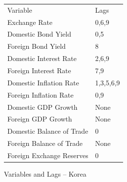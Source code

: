\documentclass{sig-alternate-05-2015}
\begin{document}
\begin{figure}
\centering
\caption{Variables and Lags -- Korea}
\begin{tabular}{l l}
Variable 					& Lags  \\
Exchange Rate 				& 0,6,9		\\
Domestic Bond Yield			& 0,5	\\
Foreign Bond Yield			& 8	\\
Domestic Interest Rate		& 2,6,9	\\
Foreign Interest Rate		& 7,9	\\
Domestic Inflation Rate		& 1,3,5,6,9	\\
Foreign Inflation Rate		& 0,9	\\
Domestic GDP Growth			& None	\\
Foreign GDP Growth			& None		\\
Domestic Balance of Trade	& 0	\\
Foreign Balance of Trade		& None	\\
Foreign Exchange Reserves	& 0	\\
\end{tabular}
\label{tab:korea_vars}
\end{figure}
\end{document}
